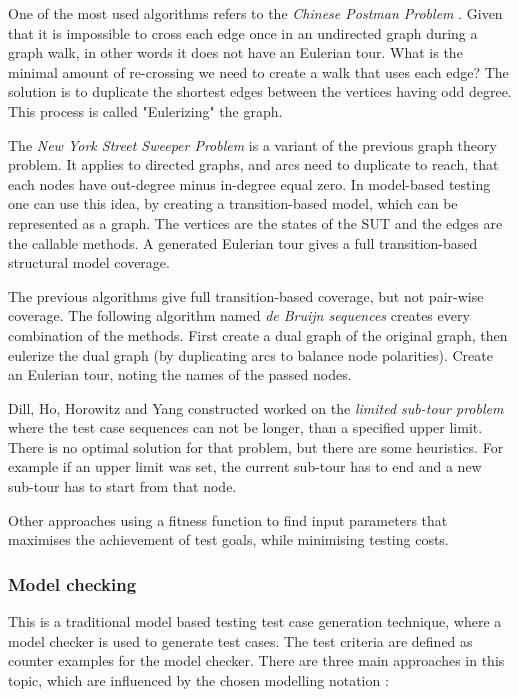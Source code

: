 One of the most used algorithms refers to the \textit{Chinese Postman Problem} \cite{graphtheorymbt}. Given that it is impossible to cross each edge once in an undirected graph during a graph walk, in other words it does not have an Eulerian tour. What is the minimal amount of re-crossing we need to create a walk that uses each edge? The solution is to duplicate the shortest edges between the vertices having odd degree. This process is called "Eulerizing" the graph.

The \textit{New York Street Sweeper Problem} is a variant of the previous graph theory problem. It applies to directed graphs, and arcs need to duplicate to reach, that each nodes have out-degree minus in-degree equal zero. In model-based testing one can use this idea, by creating a transition-based model, which can be represented as a graph. The vertices are the states of the SUT and the edges are the callable methods. A generated Eulerian tour gives a full transition-based structural model coverage.

The previous algorithms give full transition-based coverage, but not pair-wise coverage. The following algorithm named \textit{de Bruijn sequences} creates every combination of the methods. First create a dual graph of the original graph, then eulerize the dual graph (by duplicating arcs to balance node polarities). Create an Eulerian tour, noting the names of the passed nodes.

Dill, Ho, Horowitz and Yang constructed worked on the \textit{limited sub-tour problem} where the test case sequences can not be longer, than a specified upper limit. There is no optimal solution for that problem, but there are some heuristics. For example if an upper limit was set, the current sub-tour has to end and a new sub-tour has to start from that node.

Other approaches using a fitness function to find input parameters that maximises the achievement of test goals, while minimising testing costs.


\subsubsection{Model checking}
\label{ssub:modelchecking}

This is a traditional model based testing test case generation technique, where a model checker is used to generate test cases. The test criteria are defined as counter examples for the model checker. There are three main approaches in this topic, which are influenced by the chosen modelling notation \cite{sub:modelling}:


